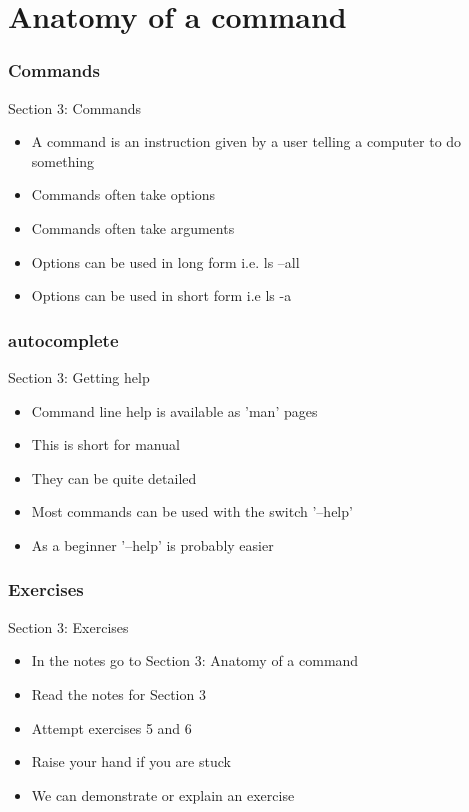 \part{Anatomy of a command}
\begin{frame}
\partpage
\end{frame}

\section{Commands}
\begin{frame}{Section 3: Commands}
\begin{itemize}
\item A command is an instruction given by a user telling a computer to do something
\item Commands often take options
\item Commands often take arguments
\item Options can be used in long form i.e. ls --all 
\item Options can be used in short form i.e ls -a
\end{itemize}
\end{frame}

\section{autocomplete}
\begin{frame}{Section 3: Getting help}
\begin{itemize}
\item Command line help is available as 'man' pages
\item This is short for manual
\item They can be quite detailed
\item Most commands can be used with the switch '--help'
\item As a beginner '--help' is probably easier
\end{itemize}
\end{frame}

\section{Exercises}
\begin{frame}{Section 3: Exercises}
\begin{itemize}
\item In the notes go to Section 3: Anatomy of a command
\item Read the notes for Section 3 
\item Attempt exercises 5 and 6
\item Raise your hand if you are stuck
\item We can demonstrate or explain an exercise
\end{itemize}
\end{frame}

